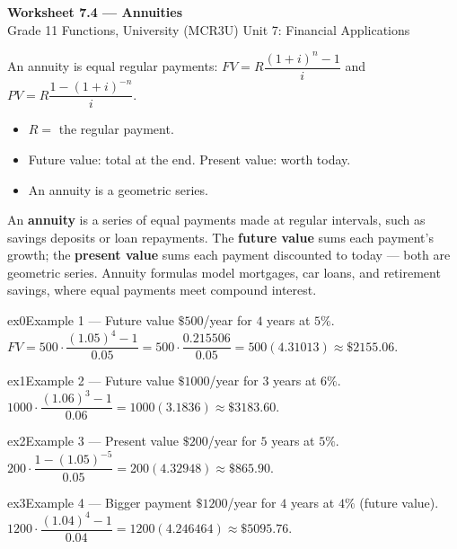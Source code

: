 \documentclass[11pt]{article}
\begin{document}
\begin{center}
{\LARGE\bfseries\color{titleblue}Worksheet 7.4 --- Annuities}\\[2pt]
{\small Grade 11 Functions, University (MCR3U) \textperiodcentered{} Unit 7: Financial Applications}
\end{center}

\begin{ideabox}
An annuity is equal regular payments: $FV=R\dfrac{(1+i)^{n}-1}{i}$ and $PV=R\dfrac{1-(1+i)^{-n}}{i}$.
\begin{itemize}[leftmargin=*,itemsep=2pt]
  \item $R=$ the regular payment.
  \item Future value: total at the end. Present value: worth today.
  \item An annuity is a geometric series.
\end{itemize}
\end{ideabox}

\begin{learnbox}
An \textbf{annuity} is a series of equal payments made at regular intervals, such as savings deposits or loan repayments.
The \textbf{future value} sums each payment's growth; the \textbf{present value} sums each payment discounted to today — both are geometric series.
Annuity formulas model mortgages, car loans, and retirement savings, where equal payments meet compound interest.
\end{learnbox}


\begin{example}{ex0}{Example 1 --- Future value}
$\$500$/year for $4$ years at $5\%$.\soln $FV=500\cdot\dfrac{(1.05)^{4}-1}{0.05}=500\cdot\dfrac{0.215506}{0.05}=500(4.31013)\approx\$2155.06$.
\end{example}

\begin{example}{ex1}{Example 2 --- Future value}
$\$1000$/year for $3$ years at $6\%$.\soln $1000\cdot\dfrac{(1.06)^{3}-1}{0.06}=1000(3.1836)\approx\$3183.60$.
\end{example}

\begin{example}{ex2}{Example 3 --- Present value}
$\$200$/year for $5$ years at $5\%$.\soln $200\cdot\dfrac{1-(1.05)^{-5}}{0.05}=200(4.32948)\approx\$865.90$.
\end{example}

\begin{example}{ex3}{Example 4 --- Bigger payment}
$\$1200$/year for $4$ years at $4\%$ (future value).\soln $1200\cdot\dfrac{(1.04)^{4}-1}{0.04}=1200(4.246464)\approx\$5095.76$.
\end{example}
\end{document}
